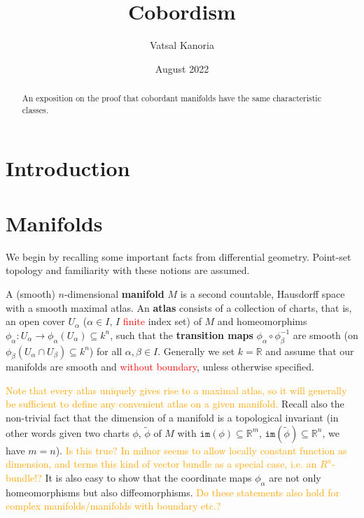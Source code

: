 \documentclass[a4paper]{article}
\theoremstyle{definition} \newtheorem*{definition}{Definition}
\theoremstyle{definition} \newtheorem*{definitions}{Definitions}
\theoremstyle{plain} \newtheorem{theorem}{Theorem}[section]
\theoremstyle{plain} \newtheorem{proposition}[theorem]{Proposition}
\theoremstyle{plain} \newtheorem{corollary}[theorem]{Corollary}
\theoremstyle{plain} \newtheorem{lemma}[theorem]{Lemma}
\theoremstyle{plain} \newtheorem{example}[theorem]{Example}
\newcommand{\checkCorrect}[1]{\textcolor{red}{#1}}
\newcommand{\understandBetter}[1]{\textcolor{orange}{#1}}
\newcommand{\question}[1]{\textcolor{orange}{#1}}
\newcommand{\defn}[1]{\textbf{#1}}
\newcommand{\realnos}{\mathbb{R}}
\begin{document}
\title{Cobordism}
\author{Vatsal Kanoria}
\date{August 2022}
\maketitle
\begin{abstract}
An exposition on the proof that cobordant manifolds have the same characteristic classes.
\end{abstract}
\tableofcontents

\section{Introduction}


\section{Manifolds}

We begin by recalling some important facts from differential geometry. Point-set topology and familiarity with these notions are assumed.

A (smooth) $n$-dimensional \defn{manifold} $M$ is a second countable, Hausdorff space with a smooth maximal atlas. An \defn{atlas} consists of a collection of charts, that is, an open cover $U_\alpha$ ($\alpha\in I$, $I$ \checkCorrect{finite} index set) of $M$ and homeomorphims $\phi_\alpha:U_\alpha \to \phi_\alpha(U_\alpha) \subseteq k^n$, such that the \defn{transition maps} $\phi_\alpha \circ \phi_\beta^{-1}$ are smooth (on $\phi_\beta(U_\alpha \cap U_\beta)\subseteq k^n$) for all $\alpha, \beta\in I$. Generally we set $k=\realnos$ and assume that our manifolds are smooth and \checkCorrect{without boundary}, unless otherwise specified. 

\understandBetter{Note that every atlas uniquely gives rise to a maximal atlas, so it will generally be sufficient to define any convenient atlas on a given manifold.} Recall also the non-trivial fact that the dimension of a manifold is a topological invariant (in other words given two charts $\phi$, $\tilde{\phi}$ of $M$ with $\mathtt{im}(\phi)\subseteq \realnos^m$, $\mathtt{im}(\tilde{\phi})\subseteq \realnos^n$, we have $m=n$). \question{Is this true? In milnor seems to allow locally constant function as dimension, and terms this kind of vector bundle as a special case, i.e. an $R^n$-bundle!?} It is also easy to show that the coordinate maps $\phi_\alpha$ are not only homeomorphisms but also diffeomorphisms. \question{Do these statements also hold for complex manifolds/manifolds with boundary etc.?}
\end{document}
